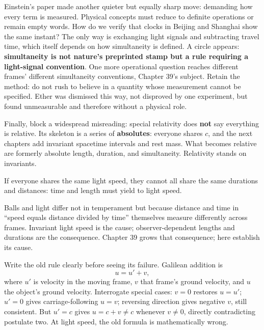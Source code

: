Einstein's paper made another quieter but equally sharp move: demanding how every term is measured. Physical concepts must reduce to definite operations or remain empty words. How do we verify that clocks in Beijing and Shanghai show the same instant? The only way is exchanging light signals and subtracting travel time, which itself depends on how simultaneity is defined. A circle appears: \textbf{simultaneity is not nature's preprinted stamp but a rule requiring a light-signal convention}. One more operational question reaches different frames' different simultaneity conventions, Chapter 39's subject. Retain the method: do not rush to believe in a quantity whose measurement cannot be specified. Ether was dismissed this way, not disproved by one experiment, but found unmeasurable and therefore without a physical role.

Finally, block a widespread misreading: special relativity does \textbf{not} say everything is relative. Its skeleton is a series of \textbf{absolutes}: everyone shares \(c\), and the next chapters add invariant spacetime intervals and rest mass. What becomes relative are formerly absolute length, duration, and simultaneity. Relativity stands on invariants.


\begin{oneline}
If everyone shares the same light speed, they cannot all share the same durations and distances: time and length must yield to light speed.
\end{oneline}

Balls and light differ not in temperament but because distance and time in ``speed equals distance divided by time'' themselves measure differently across frames. Invariant light speed is the cause; observer-dependent lengths and durations are the consequence. Chapter 39 grows that consequence; here establish its cause.


Write the old rule clearly before seeing its failure. Galilean addition is
\[
u=u'+v,
\]
where \(u'\) is velocity in the moving frame, \(v\) that frame's ground velocity, and \(u\) the object's ground velocity. Interrogate special cases: \(v=0\) restores \(u=u'\); \(u'=0\) gives carriage-following \(u=v\); reversing direction gives negative \(v\), still consistent. But \(u'=c\) gives \(u=c+v\ne c\) whenever \(v\ne0\), directly contradicting postulate two. At light speed, the old formula is mathematically wrong.

